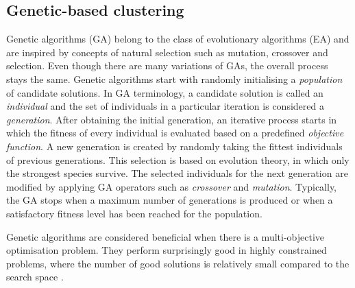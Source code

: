 \subsection{Genetic-based clustering}
Genetic algorithms (GA) belong to the class of evolutionary algorithms (EA) and are inspired by concepts of natural selection such as mutation, crossover and selection. Even though there are many variations of GAs, the overall process stays the same. Genetic algorithms start with randomly initialising a \textit{population} of candidate solutions. In GA terminology, a candidate solution is called an \textit{individual} and the set of individuals in a particular iteration is considered a \textit{generation}. After obtaining the initial generation, an iterative process starts in which the fitness of every individual is evaluated based on a predefined \textit{objective function}. A new generation is created by randomly taking the fittest individuals of previous generations. This selection is based on evolution theory, in which only the strongest species survive. The selected individuals for the next generation are modified by applying GA operators such as \textit{crossover} and \textit{mutation}. Typically, the GA stops when a maximum number of generations is produced or when a satisfactory fitness level has been reached for the population. \par
Genetic algorithms are considered beneficial when there is a multi-objective optimisation problem. They perform surprisingly good in highly constrained problems, where the number of good solutions is relatively small compared to the search space \cite{Doval1999}.
